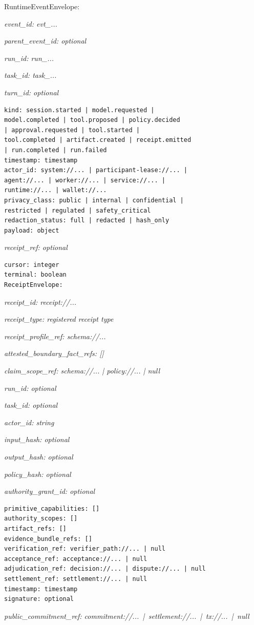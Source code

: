 \documentclass[
  11pt,
]{article}
\begin{document}
RuntimeEventEnvelope:

\emph{event\_id: evt\_...}

\emph{parent\_event\_id: optional}

\emph{run\_id: run\_...}

\emph{task\_id: task\_...}

\emph{turn\_id: optional}

\begin{lstlisting}[language={},basicstyle=\ttfamily\scriptsize]
kind: session.started | model.requested |
model.completed | tool.proposed | policy.decided
| approval.requested | tool.started |
tool.completed | artifact.created | receipt.emitted
| run.completed | run.failed
timestamp: timestamp
actor_id: system://... | participant-lease://... |
agent://... | worker://... | service://... |
runtime://... | wallet://...
privacy_class: public | internal | confidential |
restricted | regulated | safety_critical
redaction_status: full | redacted | hash_only
payload: object
\end{lstlisting}
\emph{receipt\_ref: optional}

\begin{lstlisting}[language=rustioi]
cursor: integer
terminal: boolean
ReceiptEnvelope:
\end{lstlisting}
\emph{receipt\_id: receipt://...}

\emph{receipt\_type: registered receipt type}

\emph{receipt\_profile\_ref: schema://...}

\emph{attested\_boundary\_fact\_refs: {[}{]}}

\emph{claim\_scope\_ref: schema://... | policy://... | null}

\emph{run\_id: optional}

\emph{task\_id: optional}

\emph{actor\_id: string}

\emph{input\_hash: optional}

\emph{output\_hash: optional}

\emph{policy\_hash: optional}

\emph{authority\_grant\_id: optional}

\begin{lstlisting}[language={},basicstyle=\ttfamily\scriptsize]
primitive_capabilities: []
authority_scopes: []
artifact_refs: []
evidence_bundle_refs: []
verification_ref: verifier_path://... | null
acceptance_ref: acceptance://... | null
adjudication_ref: decision://... | dispute://... | null
settlement_ref: settlement://... | null
timestamp: timestamp
signature: optional
\end{lstlisting}
\emph{public\_commitment\_ref: commitment://... \,|\,
settlement://... \,|\, tx://... \,|\, null}
\end{document}
